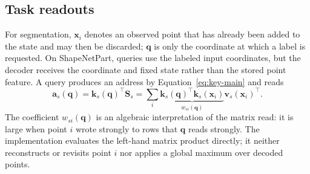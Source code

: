 \documentclass[11pt,a4paper]{article}
\newcommand{\Sstate}{\mathbf{S}}
\begin{document}
\subsection{Task readouts}
For segmentation, $\bm x_i$ denotes an observed point that has already been added to the state and may then be discarded; $\bm q$ is only the coordinate at which a label is requested. On ShapeNetPart, queries use the labeled input coordinates, but the decoder receives the coordinate and fixed state rather than the stored point feature. A query produces an address by Equation~\eqref{eq:key-main} and reads
\begin{equation}
\bm a_s(\bm q)=\bm k_s(\bm q)^\top\Sstate_s
=\sum_i \underbrace{\bm k_s(\bm q)^\top\bm k_s(\bm x_i)}_{w_{si}(\bm q)}
\bm v_s(\bm x_i)^\top .
\label{eq:effective-read-main}
\end{equation}
The coefficient $w_{si}(\bm q)$ is an algebraic interpretation of the matrix read: it is large when point $i$ wrote strongly to rows that $\bm q$ reads strongly. The implementation evaluates the left-hand matrix product directly; it neither reconstructs or revisits point $i$ nor applies a global maximum over decoded points.
\end{document}
